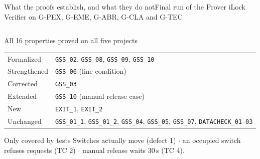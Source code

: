 \documentclass[aspectratio=169,10pt]{beamer}
\newcommand{\smallfont}{\fontsize{7}{8.6}\selectfont}
\begin{document}
\begin{frame}[label=sec_results]{What the proofs establish, and what they do not}{Final run of the Prover iLock Verifier on G-PEX, G-EME, G-ABR, G-CLA and G-TEC}
  \begin{columns}[T]
    \begin{column}{0.47\textwidth}
      \begin{safebox}{All 16 properties proved on all five projects}
        \smallfont
        \renewcommand{\arraystretch}{1.25}
        \begin{tabularx}{\linewidth}{@{}P{17mm}L@{}}
          Formalized   & \texttt{GSS\_02}, \texttt{GSS\_08}, \texttt{GSS\_09}, \texttt{GSS\_10} \\
          Strengthened & \texttt{GSS\_06} (line condition) \\
          Corrected    & \texttt{GSS\_03} \\
          Extended     & \texttt{GSS\_10} (manual release case) \\
          New          & \texttt{EXIT\_1}, \texttt{EXIT\_2} \\
          Unchanged    & \texttt{GSS\_01\_1}, \texttt{GSS\_01\_2}, \texttt{GSS\_04}, \texttt{GSS\_05}, \texttt{GSS\_07}, \texttt{DATACHECK\_01}--\texttt{03} \\
        \end{tabularx}
      \end{safebox}
      \vspace{-1mm}
      \begin{alertbox}{Only covered by tests}
        \smallfont
        Switches actually move (defect 1) $\cdot$ an occupied switch refuses requests (TC 2) $\cdot$ manual release waits 30\,s (TC 4).
      \end{alertbox}
    \end{column}


\end{columns}
\end{frame}
\end{document}
